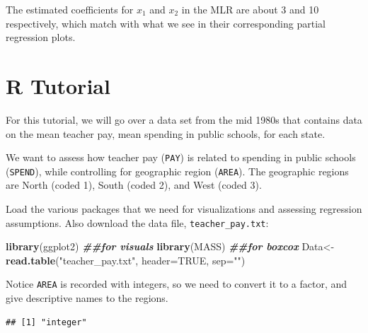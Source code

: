 \documentclass[
]{book}
\newenvironment{Shaded}{\begin{snugshade}}{\end{snugshade}}
\newcommand{\AttributeTok}[1]{\textcolor[rgb]{0.13,0.29,0.53}{#1}}
\newcommand{\ConstantTok}[1]{\textcolor[rgb]{0.56,0.35,0.01}{#1}}
\newcommand{\DocumentationTok}[1]{\textcolor[rgb]{0.56,0.35,0.01}{\textbf{\textit{#1}}}}
\newcommand{\FunctionTok}[1]{\textcolor[rgb]{0.13,0.29,0.53}{\textbf{#1}}}
\newcommand{\NormalTok}[1]{#1}
\newcommand{\OtherTok}[1]{\textcolor[rgb]{0.56,0.35,0.01}{#1}}
\newcommand{\SpecialCharTok}[1]{\textcolor[rgb]{0.81,0.36,0.00}{\textbf{#1}}}
\newcommand{\StringTok}[1]{\textcolor[rgb]{0.31,0.60,0.02}{#1}}
\begin{document}
The estimated coefficients for \(x_1\) and \(x_2\) in the MLR are about 3 and 10 respectively, which match with what we see in their corresponding partial regression plots.

\hypertarget{r-tutorial-7}{%
\section{R Tutorial}\label{r-tutorial-7}}

For this tutorial, we will go over a data set from the mid 1980s that contains data on the mean teacher pay, mean spending in public schools, for each state.

We want to assess how teacher pay (\texttt{PAY}) is related to spending in public schools (\texttt{SPEND}), while controlling for geographic region (\texttt{AREA}). The geographic regions are North (coded 1), South (coded 2), and West (coded 3).

Load the various packages that we need for visualizations and assessing regression assumptions. Also download the data file, \texttt{teacher\_pay.txt}:

\begin{Shaded}
\begin{Highlighting}[]
\FunctionTok{library}\NormalTok{(ggplot2) }\DocumentationTok{\#\#for visuals}
\FunctionTok{library}\NormalTok{(MASS) }\DocumentationTok{\#\#for boxcox}
\NormalTok{Data}\OtherTok{\textless{}{-}}\FunctionTok{read.table}\NormalTok{(}\StringTok{"teacher\_pay.txt"}\NormalTok{, }\AttributeTok{header=}\ConstantTok{TRUE}\NormalTok{, }\AttributeTok{sep=}\StringTok{""}\NormalTok{)}
\end{Highlighting}
\end{Shaded}

Notice \texttt{AREA} is recorded with integers, so we need to convert it to a factor, and give descriptive names to the regions.

\begin{Shaded}
\end{Shaded}

\begin{verbatim}
## [1] "integer"
\end{verbatim}

\begin{Shaded}
\end{Shaded}
\end{document}
